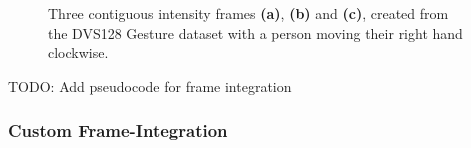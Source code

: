 \begin{figure}[htb]%
    \centering
    \qquad
    \qquad
    \caption{Three contiguous intensity frames \textbf{(a)}, \textbf{(b)} and \textbf{(c)}, created from the DVS128 Gesture dataset with a person moving their right hand clockwise.}%
    \label{fig:dvs128_integrated_frames}%
\end{figure}

\color{red} TODO: Add pseudocode for frame integration \color{black}

\subsubsection{Custom Frame-Integration} \label{sssec:custom_frame_integration_implementation}

